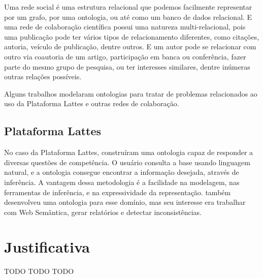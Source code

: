 Uma rede social é uma estrutura relacional que podemos facilmente representar por um grafo, por uma ontologia, ou até como um banco de dados relacional. E uma rede de colaboração científica possui uma natureza multi-relacional,
pois uma publicação pode ter vários tipos de relacionamento diferentes, como citações, autoria, veículo de publicação, dentre outros. E um autor pode se relacionar com outro via coautoria de um artigo, participação em banca ou conferência, fazer parte do mesmo grupo de pesquisa, ou ter interesses similares, dentre inúmeras outras relações possíveis.

Alguns trabalhos modelaram ontologias para tratar de problemas relacionados ao uso da Plataforma Lattes e outras redes de colaboração.


\subsection{Plataforma Lattes}
\label{ssec:lattes}

No caso da Plataforma Lattes, \citet{Anaue2009} construíram uma ontologia capaz de responder a diversas questões de competência. O usuário consulta a base usando linguagem natural, e a ontologia consegue encontrar a informação desejada, através de inferência. A vantagem dessa metodologia é a facilidade na modelagem, nas ferramentas de inferência, e na
expressividade da representação. \citet{Galego2013} também desenvolveu uma ontologia para esse domínio, mas seu interesse era trabalhar com Web Semântica, gerar relatórios e detectar inconsistências.


\section{Justificativa}
\label{sec:justificativa}


TODO TODO TODO
